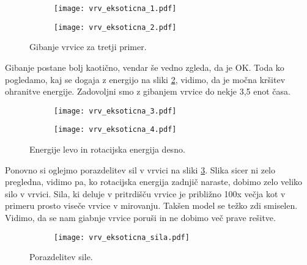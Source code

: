 \documentclass[12pt,a4paper]{article}
\begin{document}
\begin{figure}[H]
    \centering
    \begin{subfigure}[b]{0.45\textwidth}  			
        \texttt{[image: vrv\_eksoticna\_1.pdf]}
    \end{subfigure}
    \begin{subfigure}[b]{0.45\textwidth}  			
        \texttt{[image: vrv\_eksoticna\_2.pdf]}
    \end{subfigure}
    \caption{Gibanje vrvice za tretji primer.} \label{fig:slika9}
\end{figure}

\noindent Gibanje postane bolj kaotično, vendar še vedno zgleda, da je OK. Toda ko pogledamo, kaj se dogaja z energijo na sliki \ref{fig:slika10}, vidimo, da je močna kršitev ohranitve energije. Zadovoljni smo z gibanjem vrvice do nekje 3,5 enot časa.

\begin{figure}[H]
    \centering
    \begin{subfigure}[b]{0.45\textwidth}  			
        \texttt{[image: vrv\_eksoticna\_3.pdf]}
    \end{subfigure}
    \begin{subfigure}[b]{0.45\textwidth}  			
        \texttt{[image: vrv\_eksoticna\_4.pdf]}
    \end{subfigure}
    \caption{Energije levo in rotacijska energija desno.} \label{fig:slika10}
\end{figure} 

\noindent Ponovno si oglejmo porazdelitev sil v vrvici na sliki \ref{fig:slika11}. Slika sicer ni zelo pregledna, vidimo pa, ko rotacijska energija zadnjič naraste, dobimo zelo veliko silo v vrvici. Sila, ki deluje v pritrdišču vrvice je približno 100x večja kot v primeru prosto viseče vrvice v mirovanju. Takšen model se težko zdi smiselen. Vidimo, da se nam giabnje vrvice poruši in ne dobimo več prave rešitve.

\begin{figure}[H]
    \centering
    \begin{subfigure}[b]{0.8\textwidth}  			
        \texttt{[image: vrv\_eksoticna\_sila.pdf]}
    \end{subfigure}
    \caption{Porazdelitev sile.} \label{fig:slika11}
\end{figure}
\end{document}
